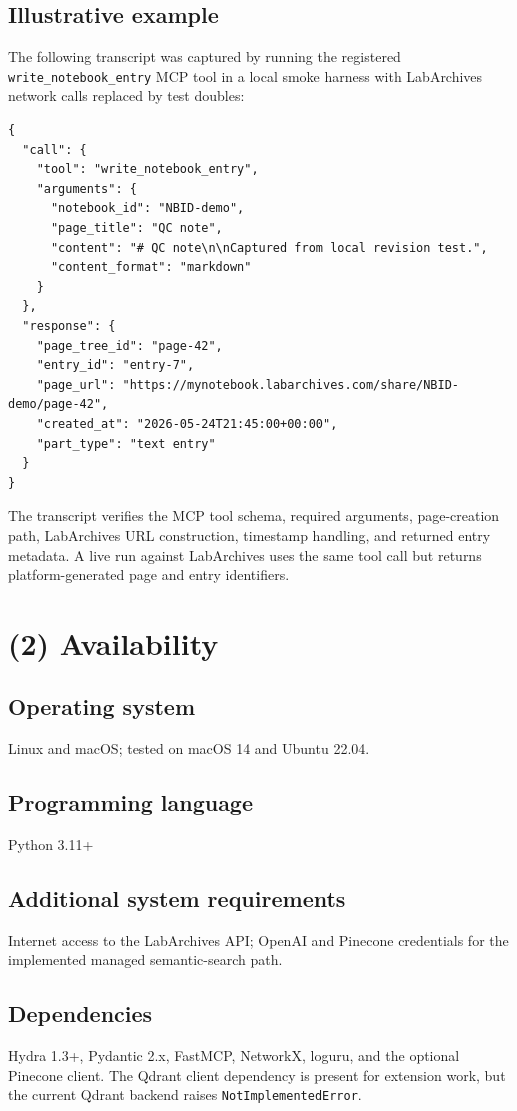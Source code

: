 \documentclass{josr}
\begin{document}
\subsection*{Illustrative example}
The following transcript was captured by running the registered \texttt{write\_notebook\_entry} MCP tool in a local smoke harness with LabArchives network calls replaced by test doubles:

\begin{verbatim}
{
  "call": {
    "tool": "write_notebook_entry",
    "arguments": {
      "notebook_id": "NBID-demo",
      "page_title": "QC note",
      "content": "# QC note\n\nCaptured from local revision test.",
      "content_format": "markdown"
    }
  },
  "response": {
    "page_tree_id": "page-42",
    "entry_id": "entry-7",
    "page_url": "https://mynotebook.labarchives.com/share/NBID-demo/page-42",
    "created_at": "2026-05-24T21:45:00+00:00",
    "part_type": "text entry"
  }
}
\end{verbatim}

The transcript verifies the MCP tool schema, required arguments, page-creation path, LabArchives URL construction, timestamp handling, and returned entry metadata. A live run against LabArchives uses the same tool call but returns platform-generated page and entry identifiers.

\section*{(2) Availability}

\subsection*{Operating system}
Linux and macOS; tested on macOS 14 and Ubuntu 22.04.

\subsection*{Programming language}
Python 3.11+

\subsection*{Additional system requirements}
Internet access to the LabArchives API; OpenAI and Pinecone credentials for the implemented managed semantic-search path.

\subsection*{Dependencies}
Hydra 1.3+, Pydantic 2.x, FastMCP, NetworkX, loguru, and the optional Pinecone client. The Qdrant client dependency is present for extension work, but the current Qdrant backend raises \texttt{NotImplementedError}.
\end{document}
